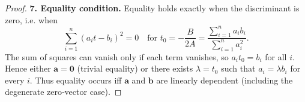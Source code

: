 \begin{proof}
\textbf{7. Equality condition.}  
Equality holds exactly when the discriminant is zero, i.e. when
\[
\sum_{i=1}^{n}(a_{i}t-b_{i})^{2}=0
\quad\text{for }t_{0}=-\frac{B}{2A}
   =\frac{\sum_{i=1}^{n}a_{i}b_{i}}{\sum_{i=1}^{n}a_{i}^{2}}.
\]
The sum of squares can vanish only if each term vanishes, so
$a_{i}t_{0}=b_{i}$ for all $i$. Hence either $\mathbf a=\mathbf 0$ (trivial
equality) or there exists $\lambda=t_{0}$ such that $a_{i}=\lambda b_{i}$ for every $i$.
Thus equality occurs iff $\mathbf a$ and $\mathbf b$ are linearly dependent
(including the degenerate zero‑vector case).

\end{proof}